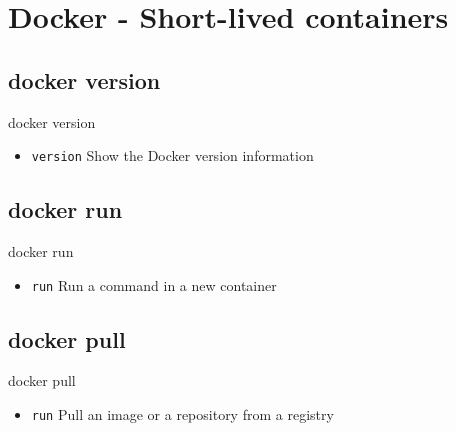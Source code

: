 

\section{Docker - Short-lived containers}\label{sec:docker-short-lived-containers}

\subsection{docker version}\label{subsec:docker-version}
\begin{frame}{docker version}
    \begin{itemize}
        \item \texttt{version} Show the Docker version information
        \pause
        
    \end{itemize}
\end{frame}

\subsection{docker run}\label{subsec:docker-run}
\begin{frame}{docker run}
    \begin{itemize}
        \item \texttt{run} Run a command in a new container
        \pause
        
    \end{itemize}
\end{frame}

\subsection{docker pull}\label{subsec:docker-pull}
\begin{frame}{docker pull}
    \begin{itemize}
        \item \texttt{run} Pull an image or a repository from a registry
        \pause
        
    \end{itemize}
\end{frame}

